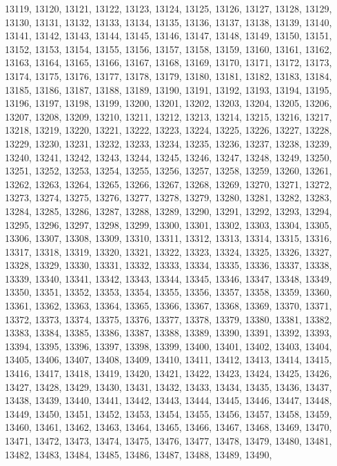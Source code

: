 13119,
13120,
13121,
13122,
13123,
13124,
13125,
13126,
13127,
13128,
13129,
13130,
13131,
13132,
13133,
13134,
13135,
13136,
13137,
13138,
13139,
13140,
13141,
13142,
13143,
13144,
13145,
13146,
13147,
13148,
13149,
13150,
13151,
13152,
13153,
13154,
13155,
13156,
13157,
13158,
13159,
13160,
13161,
13162,
13163,
13164,
13165,
13166,
13167,
13168,
13169,
13170,
13171,
13172,
13173,
13174,
13175,
13176,
13177,
13178,
13179,
13180,
13181,
13182,
13183,
13184,
13185,
13186,
13187,
13188,
13189,
13190,
13191,
13192,
13193,
13194,
13195,
13196,
13197,
13198,
13199,
13200,
13201,
13202,
13203,
13204,
13205,
13206,
13207,
13208,
13209,
13210,
13211,
13212,
13213,
13214,
13215,
13216,
13217,
13218,
13219,
13220,
13221,
13222,
13223,
13224,
13225,
13226,
13227,
13228,
13229,
13230,
13231,
13232,
13233,
13234,
13235,
13236,
13237,
13238,
13239,
13240,
13241,
13242,
13243,
13244,
13245,
13246,
13247,
13248,
13249,
13250,
13251,
13252,
13253,
13254,
13255,
13256,
13257,
13258,
13259,
13260,
13261,
13262,
13263,
13264,
13265,
13266,
13267,
13268,
13269,
13270,
13271,
13272,
13273,
13274,
13275,
13276,
13277,
13278,
13279,
13280,
13281,
13282,
13283,
13284,
13285,
13286,
13287,
13288,
13289,
13290,
13291,
13292,
13293,
13294,
13295,
13296,
13297,
13298,
13299,
13300,
13301,
13302,
13303,
13304,
13305,
13306,
13307,
13308,
13309,
13310,
13311,
13312,
13313,
13314,
13315,
13316,
13317,
13318,
13319,
13320,
13321,
13322,
13323,
13324,
13325,
13326,
13327,
13328,
13329,
13330,
13331,
13332,
13333,
13334,
13335,
13336,
13337,
13338,
13339,
13340,
13341,
13342,
13343,
13344,
13345,
13346,
13347,
13348,
13349,
13350,
13351,
13352,
13353,
13354,
13355,
13356,
13357,
13358,
13359,
13360,
13361,
13362,
13363,
13364,
13365,
13366,
13367,
13368,
13369,
13370,
13371,
13372,
13373,
13374,
13375,
13376,
13377,
13378,
13379,
13380,
13381,
13382,
13383,
13384,
13385,
13386,
13387,
13388,
13389,
13390,
13391,
13392,
13393,
13394,
13395,
13396,
13397,
13398,
13399,
13400,
13401,
13402,
13403,
13404,
13405,
13406,
13407,
13408,
13409,
13410,
13411,
13412,
13413,
13414,
13415,
13416,
13417,
13418,
13419,
13420,
13421,
13422,
13423,
13424,
13425,
13426,
13427,
13428,
13429,
13430,
13431,
13432,
13433,
13434,
13435,
13436,
13437,
13438,
13439,
13440,
13441,
13442,
13443,
13444,
13445,
13446,
13447,
13448,
13449,
13450,
13451,
13452,
13453,
13454,
13455,
13456,
13457,
13458,
13459,
13460,
13461,
13462,
13463,
13464,
13465,
13466,
13467,
13468,
13469,
13470,
13471,
13472,
13473,
13474,
13475,
13476,
13477,
13478,
13479,
13480,
13481,
13482,
13483,
13484,
13485,
13486,
13487,
13488,
13489,
13490,
